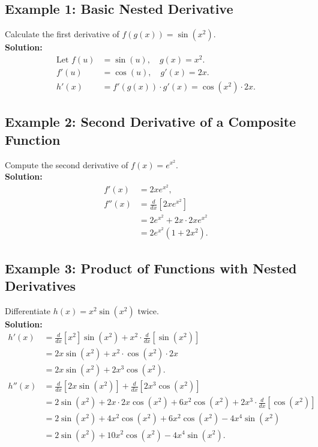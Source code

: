 \documentclass{article}
\begin{document}
\subsection{Example 1: Basic Nested Derivative}
Calculate the first derivative of $f(g(x)) = \sin(x^2)$. \\
\textbf{Solution:}
\begin{align*}
\text{Let } f(u) &= \sin(u), \quad g(x) = x^2. \\
f'(u) &= \cos(u), \quad g'(x) = 2x. \\
h'(x) &= f'(g(x)) \cdot g'(x) = \cos(x^2) \cdot 2x.
\end{align*}

\subsection{Example 2: Second Derivative of a Composite Function}
Compute the second derivative of $f(x) = e^{x^2}$. \\
\textbf{Solution:}
\begin{align*}
f'(x) &= 2x e^{x^2}, \\
f''(x) &= \frac{d}{dx}[2x e^{x^2}] \\
&= 2 e^{x^2} + 2x \cdot 2x e^{x^2} \\
&= 2e^{x^2}(1 + 2x^2).
\end{align*}

\subsection{Example 3: Product of Functions with Nested Derivatives}
Differentiate $h(x) = x^2 \sin(x^2)$ twice. \\
\textbf{Solution:}
\begin{align*}
h'(x) &= \frac{d}{dx}[x^2] \sin(x^2) + x^2 \cdot \frac{d}{dx}[\sin(x^2)] \\
&= 2x \sin(x^2) + x^2 \cdot \cos(x^2) \cdot 2x \\
&= 2x \sin(x^2) + 2x^3 \cos(x^2). \\
h''(x) &= \frac{d}{dx}[2x \sin(x^2)] + \frac{d}{dx}[2x^3 \cos(x^2)] \\
&= 2 \sin(x^2) + 2x \cdot 2x \cos(x^2) + 6x^2 \cos(x^2) + 2x^3 \cdot \frac{d}{dx}[\cos(x^2)] \\
&= 2 \sin(x^2) + 4x^2 \cos(x^2) + 6x^2 \cos(x^2) - 4x^4 \sin(x^2) \\
&= 2 \sin(x^2) + 10x^2 \cos(x^2) - 4x^4 \sin(x^2).
\end{align*}
\end{document}
